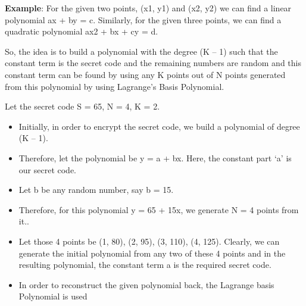 \documentclass[conference]{IEEEtran}
\begin{document}
\vspace{\baselineskip}

\textbf{Example}:
For the given two points, (x1, y1) and (x2, y2) we can find a linear polynomial ax + by = c.
Similarly, for the given three points, we can find a quadratic polynomial ax2 + bx + cy = d.

So, the idea is to build a polynomial with the degree (K – 1) such that the constant term is the secret code and the remaining numbers are random and this constant term can be found by using any K points out of N points generated from this polynomial by using Lagrange’s Basis Polynomial. 

\vspace{\baselineskip}

Let the secret code S = 65, N = 4, K = 2.

\begin{itemize}

\item Initially, in order to encrypt the secret code, we build a polynomial of degree (K – 1).


\vspace{\baselineskip}

\item Therefore, let the polynomial be y = a + bx. Here, the constant part ‘a’ is our secret code.

\vspace{\baselineskip}

\item Let b be any random number, say b = 15.

\vspace{\baselineskip}

\item Therefore, for this polynomial y = 65 + 15x, we generate N = 4 points from it..

\vspace{\baselineskip}



\item Let those 4 points be (1, 80), (2, 95), (3, 110), (4, 125). Clearly, we can generate the initial polynomial from any two of these 4 points and in the resulting polynomial, the constant term a is the required secret code.

\item In order to reconstruct the given polynomial back, the Lagrange basis Polynomial is used
\end{itemize}
\end{document}
